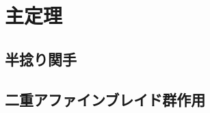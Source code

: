 \documentclass[uplatex,11pt,a4paper,dvipdfmx]{jsarticle}
\numberwithin{equation}{section}
\theoremstyle{definition}
\begin{document}
\section{主定理}
\subsection{半捻り関手}
\subsection{二重アファインブレイド群作用}
\end{document}
